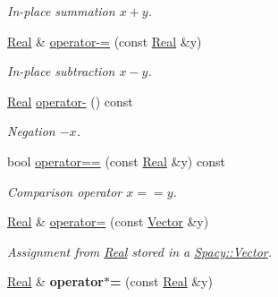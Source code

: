 \begin{DoxyCompactItemize}
\begin{DoxyCompactList}\small\item\em In-\/place summation $x+y$. \end{DoxyCompactList}\item 
\hypertarget{classSpacy_1_1Real_a6af6b5e8aeeaa16be7acc6cdb6b0a9a4}{}\hyperlink{classSpacy_1_1Real}{Real} \& \hyperlink{classSpacy_1_1Real_a6af6b5e8aeeaa16be7acc6cdb6b0a9a4}{operator-\/=} (const \hyperlink{classSpacy_1_1Real}{Real} \&y)\label{classSpacy_1_1Real_a6af6b5e8aeeaa16be7acc6cdb6b0a9a4}

\begin{DoxyCompactList}\small\item\em In-\/place subtraction $x-y$. \end{DoxyCompactList}\item 
\hypertarget{classSpacy_1_1Real_a80a38fc76ef7c232c32f786a23bbc66f}{}\hyperlink{classSpacy_1_1Real}{Real} \hyperlink{classSpacy_1_1Real_a80a38fc76ef7c232c32f786a23bbc66f}{operator-\/} () const \label{classSpacy_1_1Real_a80a38fc76ef7c232c32f786a23bbc66f}

\begin{DoxyCompactList}\small\item\em Negation $ -x$. \end{DoxyCompactList}\item 
\hypertarget{classSpacy_1_1Real_ad645186efb6b872df9045fddb41534fd}{}bool \hyperlink{classSpacy_1_1Real_ad645186efb6b872df9045fddb41534fd}{operator==} (const \hyperlink{classSpacy_1_1Real}{Real} \&y) const \label{classSpacy_1_1Real_ad645186efb6b872df9045fddb41534fd}

\begin{DoxyCompactList}\small\item\em Comparison operator $ x==y$. \end{DoxyCompactList}\item 
\hyperlink{classSpacy_1_1Real}{Real} \& \hyperlink{classSpacy_1_1Real_aed6727526ee908df0a64fd0d84bf8eee}{operator=} (const \hyperlink{classSpacy_1_1Vector}{Vector} \&y)
\begin{DoxyCompactList}\small\item\em Assignment from \hyperlink{classSpacy_1_1Real}{Real} stored in a \hyperlink{classSpacy_1_1Vector}{Spacy\+::\+Vector}. \end{DoxyCompactList}\item 
\hypertarget{classSpacy_1_1Real_a9df988fec4985a0c7103dc0d9c070b2f}{}\hyperlink{classSpacy_1_1Real}{Real} \& {\bfseries operator$\ast$=} (const \hyperlink{classSpacy_1_1Real}{Real} \&y)\label{classSpacy_1_1Real_a9df988fec4985a0c7103dc0d9c070b2f}


\end{DoxyCompactItemize}
